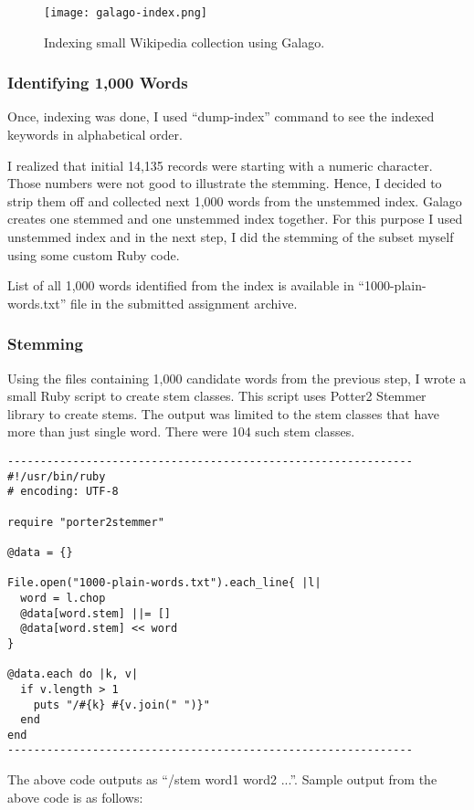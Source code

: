 \documentclass[letterpaper,12pt]{article}
\begin{document}
\begin{figure}[htp]
\centering
\texttt{[image: galago-index.png]}
\caption{Indexing small Wikipedia collection using Galago.}
\label{gi}
\end{figure}

\subsubsection{Identifying 1,000 Words}

Once, indexing was done, I used ``dump-index'' command to see the indexed keywords in alphabetical order.

I realized that initial 14,135 records were starting with a numeric character. Those numbers were not good to illustrate the stemming. Hence, I decided to strip them off and collected next 1,000 words from the unstemmed index. Galago creates one stemmed and one unstemmed index together. For this purpose I used unstemmed index and in the next step, I did the stemming of the subset myself using some custom Ruby code.

List of all 1,000 words identified from the index is available in ``1000-plain-words.txt'' file in the submitted assignment archive.

\subsubsection{Stemming}

Using the files containing 1,000 candidate words from the previous step, I wrote a small Ruby script to create stem classes. This script uses Potter2 Stemmer library to create stems. The output was limited to the stem classes that have more than just single word. There were 104 such stem classes.

\begin{verbatim}
--------------------------------------------------------------
#!/usr/bin/ruby
# encoding: UTF-8

require "porter2stemmer"

@data = {}

File.open("1000-plain-words.txt").each_line{ |l|
  word = l.chop
  @data[word.stem] ||= []
  @data[word.stem] << word
}

@data.each do |k, v|
  if v.length > 1
    puts "/#{k} #{v.join(" ")}"
  end
end
--------------------------------------------------------------
\end{verbatim}

The above code outputs as ``/stem word1 word2 ...''. Sample output from the above code is as follows:
\end{document}
